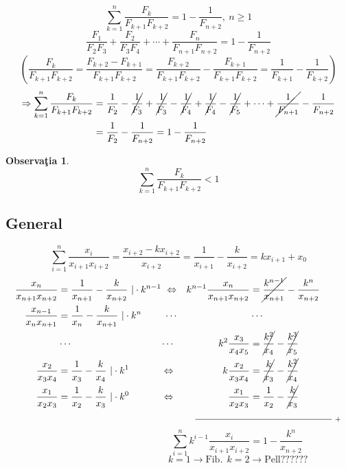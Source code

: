\documentclass[12pt]{article}
\theoremstyle{definition}
\newtheorem{obs}{Observa\c tia}
\begin{document}
\[
\sum_{k=1}^{n} \frac{F_k}{F_{k+1} F_{k+2}} = 1 - \frac{1}{F_{n+2}},\ n \geq 1
\]
\[
\frac{F_1}{F_2F_3}+\frac{F_2}{F_3F_4}+\cdots+\frac{F_n}{F_{n+1}F_{n+2}}= 1 - \frac{1}{F_{n+2}}
\]
\[
	\left( \frac{F_k}{F_{k+1}F_{k+2}} = \frac{F_{k+2}-F_{k+1}}{F_{k+1}F_{k+2}} =\frac{F_{k+2}}{F_{k+1}F_{k+2}}-\frac{F_{k+1}}{F_{k+1}F_{k+2}} = \frac{1}{F_{k+1}} - \frac{1}{F_{k+2}} \right)
\]
\[
\begin{aligned}
	\Rightarrow \sum_{k=1}^{n} \frac{F_k}{F_{k+1} F_{k+2}} & = \frac{1}{F_2} -\cancel{\frac{1}{F_3}} + \cancel{\frac{1}{F_3}} - \cancel{\frac{1}{F_4}} + \cancel{\frac{1}{F_4}} -\cancel{\frac{1}{F_5}} + \cdots + \cancel{\frac{1}{F_{n+1}}} - \frac{1}{F_{n+2}} \\ 
	&= \frac{1}{F_2} - \frac{1}{F_{n+2}}= 1 - \frac{1}{F_{n+2}}
\end{aligned}
\]
\begin{obs}
	\[ \sum_{k=1}^{n} \frac{F_k}{F_{k+1} F_{k+2}}  < 1\]
\end{obs}

\subsection*{General}
\[
 \sum_{i=1}^{n} \frac{x_i}{x_{i+1} x_{i+2}}=\frac{x_{i+2}-kx_{i+2}}{x_{i+2}}=\frac{1}{x_{i+1}}-\frac{k}{x_{i+2}}=kx_{i+1} + x_0 
\]
\[
	\begin{aligned}
		\frac{x_{n}}{x_{n+1}x_{n+2}}&=\frac{1}{x_{n+1}}-\frac{k}{x_{n+2}}\ |\cdot k^{n-1}\ \Leftrightarrow  &k^{n-1}\frac{x_{n}}{x_{n+1}x_{n+2}}&=\cancel{\frac{k^{n-1}}{x_{n+1}}}-\frac{k^n}{x_{n+2}}\\
		\frac{x_{n-1}}{x_{n}x_{n+1}}&=\frac{1}{x_{n}}-\frac{k}{x_{n+1}}\ |\cdot k^{n} \ \ \ \ \ \ \ \cdots & &\cdots \\
		&\cdots \ \ \ \ \ \ \ \ \ \ \ \ \ \ \ \ \ \ \ \ \ \ \ \ \ \ \ \ \cdots & k^2\frac{x_{3}}{x_{4}x_{5}}&=\cancel{\frac{k^2}{x_{4}}}-\cancel{\frac{k^3}{x_{5}}}\\
		\frac{x_{2}}{x_{3}x_{4}}&=\frac{1}{x_{3}}-\frac{k}{x_{4}}\ |\cdot k^1 \ \ \ \ \ \ \ \ \ \   \Leftrightarrow &k\frac{x_{2}}{x_{3}x_{4}}&=\cancel{\frac{k}{x_{3}}}-\cancel{\frac{k^2}{x_{4}}}\\
		\frac{x_{1}}{x_{2}x_{3}}&=\frac{1}{x_{2}}-\frac{k}{x_{3}}\ |\cdot k^0 \ \ \ \ \ \ \ \ \ \   \Leftrightarrow &\frac{x_{1}}{x_{2}x_{3}}&=\frac{1}{x_{2}}-\cancel{\frac{k}{x_{3}}}\\
		&&\rule{2cm}{0.4pt}&\rule{3cm}{0.4pt}\ _+
	\end{aligned}
\]
\[
\ \ \ \ \ \ \ \ \ \ \ \ \ \ \ \ \ \ \ \ \ \ \ \ \ \ \ \ \ \ \ \ \ \ \ \ \ \ \ \ \ \ \ \ \ \ \ \ \ \ \ \ \ \ \ \boxed{\sum_{i=1}^{n} k^{i-1}\frac{x_i}{x_{i+1} x_{i+2}}= 1-\frac{k^n}{x_{n+2}}}
\]
\[\ \ \ \ \ \ \ \ \ \ \ \ \ \ \ \ \ \ \ \ \ \ \ \ \ \ \ \ \ \ \ \ \ \ \ \ \ \ \ \ \ \ \ \ \ \ \ \ \ \ \ \ \ \ \ \  k=1 \rightarrow \text{Fib.}\ \  k=2\rightarrow\text{Pell} ??????\]
\end{document}

